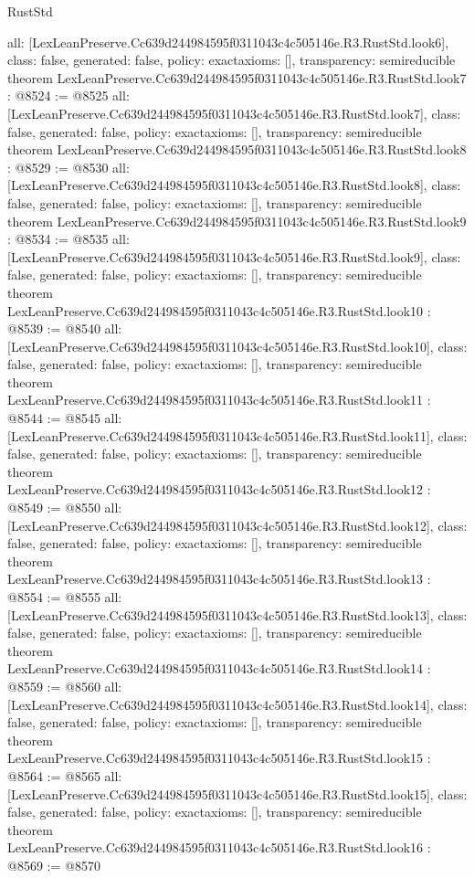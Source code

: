 \begin{lexlean}{RustStd}
\begin{coremodule}
{  all: [LexLeanPreserve.Cc639d244984595f0311043c4c505146e.R3.RustStd.look6],
  class: false,
  generated: false,
  policy: exact{axioms: []},
  transparency: semireducible
}
theorem LexLeanPreserve.Cc639d244984595f0311043c4c505146e.R3.RustStd.look7 : @8524 := @8525 {
  all: [LexLeanPreserve.Cc639d244984595f0311043c4c505146e.R3.RustStd.look7],
  class: false,
  generated: false,
  policy: exact{axioms: []},
  transparency: semireducible
}
theorem LexLeanPreserve.Cc639d244984595f0311043c4c505146e.R3.RustStd.look8 : @8529 := @8530 {
  all: [LexLeanPreserve.Cc639d244984595f0311043c4c505146e.R3.RustStd.look8],
  class: false,
  generated: false,
  policy: exact{axioms: []},
  transparency: semireducible
}
theorem LexLeanPreserve.Cc639d244984595f0311043c4c505146e.R3.RustStd.look9 : @8534 := @8535 {
  all: [LexLeanPreserve.Cc639d244984595f0311043c4c505146e.R3.RustStd.look9],
  class: false,
  generated: false,
  policy: exact{axioms: []},
  transparency: semireducible
}
theorem LexLeanPreserve.Cc639d244984595f0311043c4c505146e.R3.RustStd.look10 : @8539 := @8540 {
  all: [LexLeanPreserve.Cc639d244984595f0311043c4c505146e.R3.RustStd.look10],
  class: false,
  generated: false,
  policy: exact{axioms: []},
  transparency: semireducible
}
theorem LexLeanPreserve.Cc639d244984595f0311043c4c505146e.R3.RustStd.look11 : @8544 := @8545 {
  all: [LexLeanPreserve.Cc639d244984595f0311043c4c505146e.R3.RustStd.look11],
  class: false,
  generated: false,
  policy: exact{axioms: []},
  transparency: semireducible
}
theorem LexLeanPreserve.Cc639d244984595f0311043c4c505146e.R3.RustStd.look12 : @8549 := @8550 {
  all: [LexLeanPreserve.Cc639d244984595f0311043c4c505146e.R3.RustStd.look12],
  class: false,
  generated: false,
  policy: exact{axioms: []},
  transparency: semireducible
}
theorem LexLeanPreserve.Cc639d244984595f0311043c4c505146e.R3.RustStd.look13 : @8554 := @8555 {
  all: [LexLeanPreserve.Cc639d244984595f0311043c4c505146e.R3.RustStd.look13],
  class: false,
  generated: false,
  policy: exact{axioms: []},
  transparency: semireducible
}
theorem LexLeanPreserve.Cc639d244984595f0311043c4c505146e.R3.RustStd.look14 : @8559 := @8560 {
  all: [LexLeanPreserve.Cc639d244984595f0311043c4c505146e.R3.RustStd.look14],
  class: false,
  generated: false,
  policy: exact{axioms: []},
  transparency: semireducible
}
theorem LexLeanPreserve.Cc639d244984595f0311043c4c505146e.R3.RustStd.look15 : @8564 := @8565 {
  all: [LexLeanPreserve.Cc639d244984595f0311043c4c505146e.R3.RustStd.look15],
  class: false,
  generated: false,
  policy: exact{axioms: []},
  transparency: semireducible
}
theorem LexLeanPreserve.Cc639d244984595f0311043c4c505146e.R3.RustStd.look16 : @8569 := @8570 {
}
\end{coremodule}
\end{lexlean}

